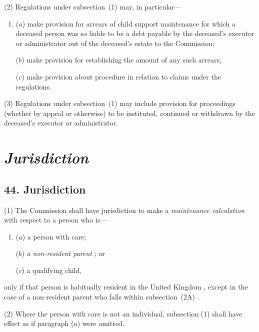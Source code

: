 \documentclass[12pt,a4paper]{article}
\begin{document}
(2) Regulations under subsection~(1) may, in particular---
\begin{enumerate}\item[]
($a$) make provision for arrears of child support maintenance for which a deceased person was so liable to be a debt payable by the deceased’s executor or administrator out of the deceased’s estate to the Commission;

($b$) make provision for establishing the amount of any such arrears;

($c$) make provision about procedure in relation to claims under the regulations.
\end{enumerate}

(3) Regulations under subsection~(1) may include provision for proceedings (whether by appeal or otherwise) to be instituted, continued or withdrawn by the deceased’s executor or administrator.


\section{\itshape Jurisdiction}

\subsection{44. Jurisdiction}

(1) 
The 
Commission  %
shall have jurisdiction to make a 
\emph{maintenance calculation}  %
with respect to a person who is—
\begin{enumerate}\item[]
($a$) a person with care;

($b$) 
\emph{a non-resident parent}%
; or

($c$) a qualifying child,
\end{enumerate}
only if that person is habitually resident in the United Kingdom%
, except in the case of a non-resident parent who falls within subsection~(2A)%
.

(2) Where the person with care is not an individual, subsection (1)  shall have effect as if paragraph ($a$)  were omitted.
\end{document}
